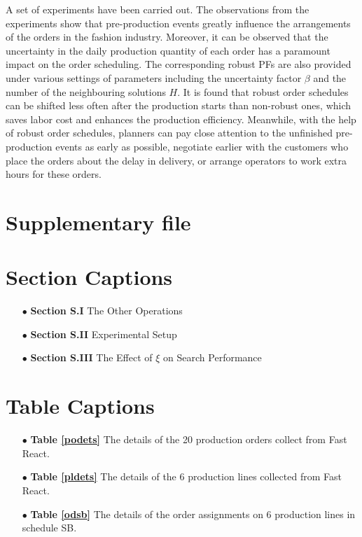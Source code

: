 \documentclass[journal]{IEEEtran}
\theoremstyle{definition}
\begin{document}
A set of experiments have been carried out. The observations from the experiments show that pre-production events greatly influence the arrangements of the orders in the fashion industry. Moreover, it can be observed that the uncertainty in the daily production quantity of each order has a paramount impact on the order scheduling. The corresponding robust PFs are also provided under various settings of parameters including the uncertainty factor $\beta$ and the number of the neighbouring solutions $H$. It is found that robust order schedules can be shifted less often after the production starts than non-robust ones, which saves labor cost and enhances the production efficiency. Meanwhile, with the help of robust order schedules, planners can pay close attention to the unfinished pre-production events as early as possible, negotiate earlier with the customers who place the orders about the delay in delivery, or arrange operators to work extra hours for these orders.

\ifCLASSOPTIONcaptionsoff
  \newpage
\fi

{\footnotesize
}
\clearpage

\section*{\Large{\textbf{Supplementary file}}}

\vspace{1cm}

\section*{Section Captions}
\begin{itemize}
\item[$\bullet$] \textbf{Section S.I} The Other Operations
\item[$\bullet$] \textbf{Section S.II} Experimental Setup
\item[$\bullet$] \textbf{Section S.III} The Effect of $\xi$ on Search Performance
\end{itemize}

\section*{Table Captions}
\begin{itemize}
\item[$\bullet$] \textbf{Table \ref{podets}} The details of the 20 production orders collect from Fast React.
\item[$\bullet$] \textbf{Table \ref{pldets}} The details of the 6 production lines collected from Fast React.
\item[$\bullet$] \textbf{Table \ref{odsb}} The details of the order assignments on 6 production lines in schedule SB.
\end{itemize}
\end{document}
